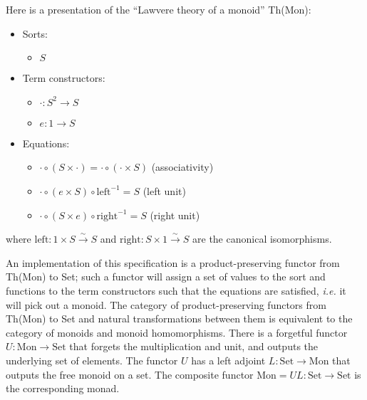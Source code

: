 \documentclass{llncs}
\newcommand{\maps}{\colon}
\newcommand{\Set}{\mathrm{Set}}
\newcommand{\Mon}{\mathrm{Mon}}
\newcommand{\leftu}{\mathrm{left}}
\newcommand{\rightu}{\mathrm{right}}
\begin{document}
Here is a presentation of the ``Lawvere theory of a monoid'' Th(Mon):\\
\begin{center}
  \begin{itemize}
    \item Sorts:
    \begin{itemize}
      \item $S$
    \end{itemize}
    \item Term constructors:
    \begin{itemize}
      \item $\cdot\maps S^2 \to S$
      \item $e\maps 1 \to S$
    \end{itemize}
    \item Equations:
    \begin{itemize}
      \item $\cdot \circ (S \times \cdot) = \cdot \circ (\cdot \times S)$ (associativity)
      \item $\cdot \circ (e \times S) \circ \leftu^{-1} = S$ (left unit)
      \item $\cdot \circ (S \times e) \circ \rightu^{-1} = S$ (right unit)        
    \end{itemize}
  \end{itemize}
\end{center}
where ${\leftu\maps 1 \times S \stackrel{\sim}{\to} S}$ and ${\rightu\maps S \times 1 \stackrel{\sim}{\to} S}$ are the canonical isomorphisms.

An implementation of this specification is a product-preserving functor from Th(Mon) to Set; such a functor will assign a set of values to the sort and functions to the term constructors such that the equations are satisfied, {\em i.e.} it will pick out a monoid.  The category of product-preserving functors from Th(Mon) to Set and natural transformations between them is equivalent to the category of monoids and monoid homomorphisms.  There is a forgetful functor $U\maps \Mon \to \Set$ that forgets the multiplication and unit, and outputs the underlying set of elements.  The functor $U$ has a left adjoint $L\maps \Set \to \Mon$ that outputs the free monoid on a set.  The composite functor $\Mon = UL\maps \Set \to \Set$ is the corresponding monad.
\end{document}
